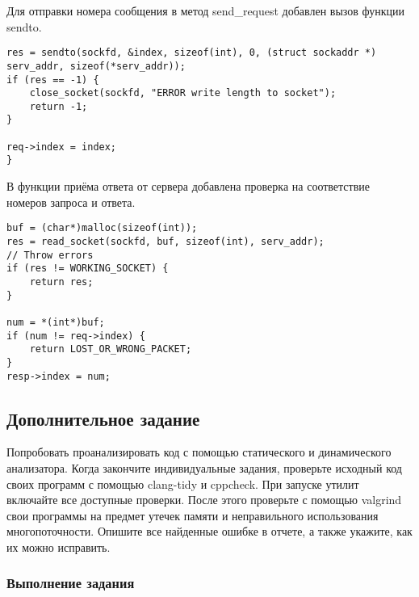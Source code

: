 Для отправки номера сообщения в метод send\_request добавлен вызов функции sendto.
\begin{lstlisting}
res = sendto(sockfd, &index, sizeof(int), 0, (struct sockaddr *) serv_addr, sizeof(*serv_addr));
if (res == -1) {
	close_socket(sockfd, "ERROR write length to socket");
	return -1;
}

req->index = index;
}
\end{lstlisting}

В функции приёма ответа от сервера добавлена проверка на соответствие номеров запроса и ответа.

\begin{lstlisting}
buf = (char*)malloc(sizeof(int));
res = read_socket(sockfd, buf, sizeof(int), serv_addr);
// Throw errors
if (res != WORKING_SOCKET) {
	return res;
}

num = *(int*)buf;
if (num != req->index) {
	return LOST_OR_WRONG_PACKET;
}
resp->index = num;
\end{lstlisting}

\subsection{Дополнительное задание}
Попробовать проанализировать код с помощью статического и динамического анализатора. Когда закончите индивидуальные задания, проверьте исходный код своих программ с помощью clang-tidy и cppcheck. При запуске утилит включайте все доступные проверки. После этого проверьте с помощью valgrind свои программы на предмет утечек памяти и неправильного использования многопоточности. Опишите все найденные ошибке в отчете, а также укажите, как их можно исправить.

\subsubsection{Выполнение задания}

